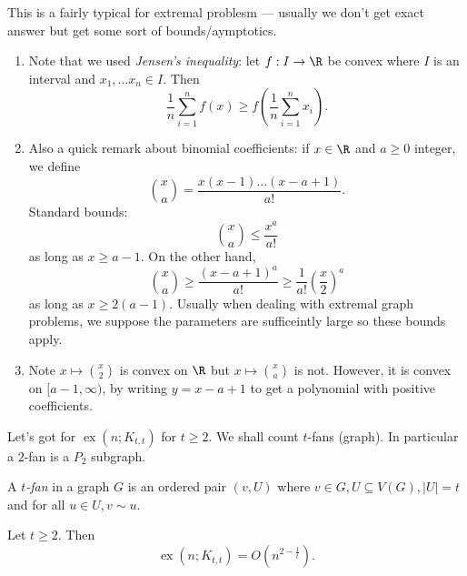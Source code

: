\documentclass[a4paper]{article}
\DeclareMathOperator{\exx}{ex} %
\begin{document}
This is a fairly typical for extremal problesm --- usually we don't get exact answer but get some sort of bounds/aymptotics.

\begin{remark}\leavevmode
  \begin{enumerate}
  \item Note that we used \emph{Jensen's inequality}: let \(f: I \to \R\) be convex where \(I\) is an interval and \(x_1, \dots x_n \in I\). Then
    \[
      \frac{1}{n} \sum_{i = 1}^n f(x) \geq f(\frac{1}{n} \sum_{i = 1}^n x_i).
    \]
  \item Also a quick remark about binomial coefficients: if \(x \in \R\) and \(a \geq 0\) integer, we define
    \[
      \binom{x}{a} = \frac{x (x - 1) \dots (x - a + 1)}{a!}.
    \]
    Standard bounds:
    \[
      \binom{x}{a} \leq \frac{x^a}{a!}
    \]
    as long as \(x \geq a - 1\). On the other hand,
    \[
      \binom{x}{a} \geq \frac{(x - a + 1)^a}{a!} \geq \frac{1}{a!} \left(\frac{x}{2} \right)^a
    \]
    as long as \(x \geq 2 (a - 1)\). Usually when dealing with extremal graph problems, we suppose the parameters are sufficeintly large so these bounds apply.
  \item Note \(x \mapsto \binom{x}{2}\) is convex on \(\R\) but \(x \mapsto \binom{x}{a}\) is not. However, it is convex on \([a - 1, \infty)\), by writing \(y = x - a + 1\) to get a polynomial with positive coefficients.
  \end{enumerate}
\end{remark}

Let's got for \(\exx(n; K_{t, t})\) for \(t \geq 2\). We shall count \(t\)-fans (graph). In particular a \(2\)-fan is a \(P_2\) subgraph.

\begin{definition}[fan]
  A \emph{\(t\)-fan} in a graph \(G\) is an ordered pair \((v, U)\) where \(v \in G, U \subseteq V(G), |U| = t\) and for all \(u \in U, v \sim u\).
\end{definition}

\begin{theorem}
  \label{thm:forbidden complete bipartite subgraph}
  Let \(t \geq 2\). Then
  \[
    \exx(n; K_{t, t}) = O(n^{2 - \frac{1}{t}}).
  \]
\end{theorem}
\end{document}
